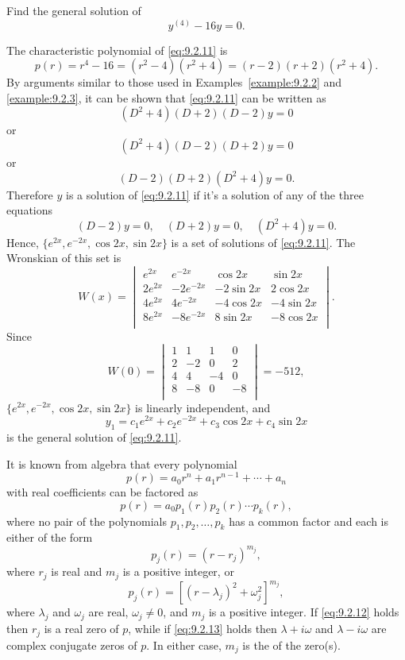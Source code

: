 \documentclass{ximera}
\begin{document}
\begin{example}\label{example:9.2.4}
Find the general solution of
\begin{equation} \label{eq:9.2.11}
y^{(4)}-16y=0.
\end{equation}


\begin{explanation}
The characteristic polynomial of
\eqref{eq:9.2.11} is
$$
p(r)=r^4-16=(r^2-4)(r^2+4)=(r-2)(r+2)(r^2+4).
$$
By arguments similar to those used in Examples~\ref{example:9.2.2} and
\ref{example:9.2.3}, it can be shown that \eqref{eq:9.2.11} can be written
as
$$
(D^2+4)(D+2)(D-2)y=0
$$
or
$$
(D^2+4)(D-2)(D+2)y=0
$$
or
$$
(D-2)(D+2)(D^2+4)y=0.
$$
Therefore $y$  is a solution of \eqref{eq:9.2.11} if it's a solution
of any  of the three  equations
$$
 (D-2)y=0,\quad (D+2)y=0, \quad(D^2+4)y=0.
$$
Hence, $\{e^{2x},e^{-2x},\cos2x,\sin2x\}$ is a set of solutions of
\eqref{eq:9.2.11}. The Wronskian of this set is
$$
W(x)=\begin{vmatrix}
e^{2x}&e^{-2x}&\cos2x&\sin2x\\
2e^{2x}&-2e^{-2x}&-2\sin2x&2\cos2x\\
4e^{2x}&4e^{-2x}&-4\cos2x&-4\sin2x\\
8e^{2x}&-8e^{-2x}&8\sin2x&-8\cos2x\\
\end{vmatrix}.
$$
Since
$$
W(0)=\begin{vmatrix}
1&1&1&0\\
2&-2&0&2\\
4&4&-4&0\\
8&-8&0&-8\\
\end{vmatrix}=-512,
$$
 $\{e^{2x},e^{-2x},\cos2x,\sin2x\}$ is linearly independent,
and
$$
y_1=c_1e^{2x}+c_2e^{-2x}+c_3\cos2x+c_4\sin2x
$$
is   the general solution of \eqref{eq:9.2.11}.
\end{explanation}
\end{example}

It is known from algebra that every polynomial
$$
p(r)=a_0r^n+a_1r^{n-1}+\cdots+a_n
$$
with real coefficients can be factored as
$$
p(r)=a_0p_1(r)p_2(r)\cdots p_k(r),
$$
where no pair of the polynomials $p_1, p_2, \dots, p_k$  has a common
factor and each  is either of the form
\begin{equation} \label{eq:9.2.12}
p_j(r)=(r-r_j)^{m_j},
\end{equation}
where $r_j$ is real and $m_j$ is a positive integer, or
\begin{equation} \label{eq:9.2.13}
p_j(r)=\left[(r-\lambda_j)^2+\omega_j^2\right]^{m_j},
\end{equation}
where $\lambda_j$ and $\omega_j$ are real, $\omega_j\neq 0$, and $m_j$
is a positive integer. If \eqref{eq:9.2.12} holds then $r_j$ is a real
zero of $p$, while if \eqref{eq:9.2.13} holds then $\lambda+i\omega$
and $\lambda-i\omega$ are complex conjugate zeros of $p$. In either
case, $m_j$ is the  of the zero(s).
\end{document}

